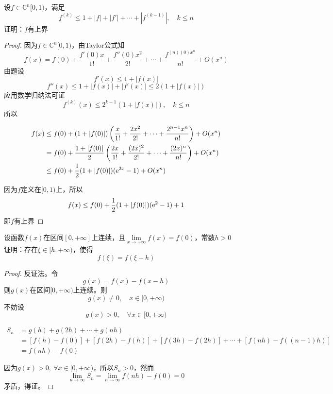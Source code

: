 \begin{proposition}
    
    设$f \in \mathbb{C}^{n}[0,1)$，满足
    $$f^{(k)} \leq 1 + |f| + |f'| + \cdots + |f^{(k-1)}|,\quad k \leq n$$
    证明：$f$有上界

\end{proposition}

\begin{proof}
    因为$f \in \mathbb{C}^{n}[0,1)$，由\textup{Taylor}公式知
    $$f(x) = f(0) + \dfrac{f'(0)x}{1!} + \dfrac{f''(0)x^2}{2!} + \cdots + \dfrac{f^{(n)(0)x^n}}{n!} + O(x^n)$$
    由题设
    $$f'(x) \leq 1 + |f(x)|$$
    $$f''(x) \leq 1 + |f(x)| + |f'(x)| \leq 2(1 + |f(x)|)$$
    应用数学归纳法可证
    $$f^{(k)}(x) \leq 2^{k-1}(1 + |f(x)|), \quad k \leq n$$
    所以

    \begin{align*}
        f(x) & \leq f(0) + (1 + |f(0)|)\left(\dfrac{x}{1!} + \dfrac{2x^2}{2!} + \cdots + \dfrac{2^{n-1}x^n}{n!}\right) + O(x^n) \\
        & = f(0) + \dfrac{1 + |f(0)|}{2}\left(\dfrac{2x}{1!} + \dfrac{(2x)^2}{2!} + \cdots + \dfrac{(2x)^{n}}{n!}\right) + O(x^n) \\
        & \leq f(0) + \dfrac{1}{2}(1 + |f(0)|)(\mathrm{e}^{2x}-1) + O(x^n)
    \end{align*}

    因为$f$定义在$[0,1)$上，所以
    $$f(x) \leq f(0) + \dfrac{1}{2}(1 + |f(0)|)(\mathrm{e}^2 - 1) + 1$$
    即$f$有上界
    
\end{proof}

\begin{proposition}
    设函数$f(x)$在区间$[0,+\infty]$上连续，且$\lim\limits_{x\to+\infty}{f(x)} = f(0)$，常数$h > 0$\\
    证明：存在$\xi \in [h,+\infty)$，使得
    $$f(\xi) = f(\xi - h)$$
\end{proposition}

\begin{proof}

    反证法。令
    $$g(x) = f(x) - f(x - h)$$
    则$g(x)$在区间$[0,+\infty)$上连续。则
    $$g(x) \neq 0, \quad x \in [0,+\infty)$$
    不妨设
    $$g(x) > 0, \quad \forall x \in [0,+\infty)$$
    
    \begin{align*}
        S_n &= g(h) + g(2h) + \cdots + g(nh) \\
        & = [f(h) - f(0)] + [f(2h) - f(h)] + [f(3h) - f(2h)] + \cdots + [f(nh) - f((n-1)h)] \\
        & = f(nh) - f(0)
    \end{align*}
  
    因为$g(x) > 0, \ \forall x \in [0,+\infty)$，所以$S_n > 0$，然而
    $$\lim_{n\to\infty}{S_n} = \lim_{n\to\infty}{f(nh)} - f(0) = 0$$
    矛盾，得证。

\end{proof}

